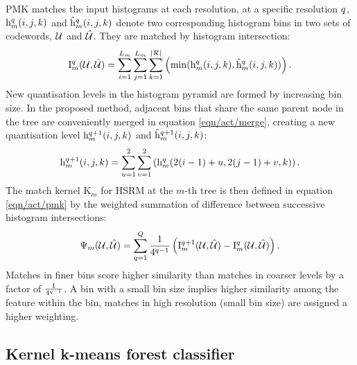 PMK matches the input histograms at each resolution, at a specific resolution $q$, $\mathrm{h}^q_{m}(i,j,k)$ and $\mathrm{\hat{h}}^q_{m}(i,j,k)$ denote two corresponding histogram bins in two sets of codewords, $\mathcal{U}$ and $\mathcal{\hat{U}}$. They are matched by histogram intersection:
\begin{equation}
	\label{eqn/act/hik}
	\mathrm{I}_{m}^q(\mathcal{U},\mathcal{\hat{U}}) =  \displaystyle\sum_{i=1}^{L_m}\sum_{j=1}^{L_m}\sum_{k=1}^{|\mathcal{R}|} \left( \min(\mathrm{h}^{q}_m(i,j,k), \mathrm{\hat{h}}^{q}_m(i,j,k)) \right).
\end{equation}
New quantisation levels in the histogram pyramid are formed by increasing bin size. In the proposed method, adjacent bins that share the same parent node in the tree are conveniently merged in equation \ref{eqn/act/merge}, creating a new quantisation level $\mathrm{h}^{q+1}_m(i,j,k)$ and $\mathrm{\hat{h}}^{q+1}_m(i,j,k)$:
\begin{equation}
	\label{eqn/act/merge}
	\mathrm{h}^{q+1}_m(i,j,k) = \displaystyle\sum_{u=1}^{2}\sum_{v=1}^{2} \left( \mathrm{h}^{q}_m(2(i-1)+u,2(j-1)+v,k) \right).
\end{equation}
The match kernel $\mathrm{K}_m$ for HSRM at the $m$-th tree is then defined in equation \ref{eqn/act/pmk} by the weighted summation of difference between successive histogram intersections:
\begin{equation}
	\label{eqn/act/pmk}
	\Psi_m(\mathcal{U},\mathcal{\hat{U}}) = \displaystyle\sum_{q = 1}^{Q}\frac{1}{4^{q-1}} \left( \mathrm{I}_{m}^{q+1}(\mathcal{U},\mathcal{\hat{U}}) - \mathrm{I}_{m}^{q}(\mathcal{U},\mathcal{\hat{U}}) \right).
\end{equation}
Matches in finer bins score higher similarity than matches in coarser levels by a factor of $\frac{1}{4^{q-1}}$. A bin with a small bin size implies higher similarity among the feature within the bin, matches in high resolution (small bin size) are assigned a higher weighting.  

\subsection{Kernel k-means forest classifier}

